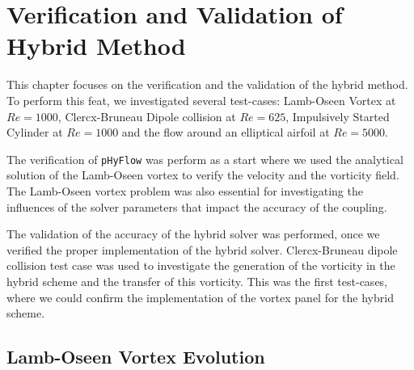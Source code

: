\chapter{Verification and Validation of Hybrid Method}
\label{ch:vavohm}

This chapter focuses on the verification and the validation of the hybrid method. To perform this feat, we investigated several test-cases: Lamb-Oseen Vortex at $Re=1000$, Clercx-Bruneau Dipole collision at $Re=625$, Impulsively Started Cylinder at $Re=1000$ and the flow around an elliptical airfoil at $Re=5000$.

The verification of \texttt{pHyFlow} was perform as a start where we used the analytical solution of the Lamb-Oseen vortex to verify the velocity and the vorticity field. The Lamb-Oseen vortex problem was also essential for investigating the influences of the solver parameters that impact the accuracy of the coupling. 

The validation of the accuracy of the hybrid solver was performed, once we verified the proper implementation of the hybrid solver. Clercx-Bruneau dipole collision test case was used to investigate the generation of the vorticity in the hybrid scheme and the transfer of this vorticity. This was the first test-cases, where we could confirm the implementation of the vortex panel for the hybrid scheme.


%
%
%
%

\section{Lamb-Oseen Vortex Evolution}

